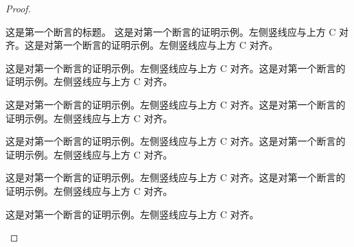\documentclass[lang=cn,a4paper,11pt,openany,scheme=chinese,twoside]{elegantbook}
\begin{document}
\begin{proof}
\begin{claim}{这是第一个断言的标题。}
这是对第一个断言的证明示例。左侧竖线应与上方 C 对齐。这是对第一个断言的证明示例。左侧竖线应与上方 C 对齐。 \par
这是对第一个断言的证明示例。左侧竖线应与上方 C 对齐。这是对第一个断言的证明示例。左侧竖线应与上方 C 对齐。 \par
这是对第一个断言的证明示例。左侧竖线应与上方 C 对齐。这是对第一个断言的证明示例。左侧竖线应与上方 C 对齐。 \par
这是对第一个断言的证明示例。左侧竖线应与上方 C 对齐。这是对第一个断言的证明示例。左侧竖线应与上方 C 对齐。 \par
这是对第一个断言的证明示例。左侧竖线应与上方 C 对齐。这是对第一个断言的证明示例。左侧竖线应与上方 C 对齐。 \par
这是对第一个断言的证明示例。左侧竖线应与上方 C 对齐。
\end{claim}
\end{proof}
\end{document}
